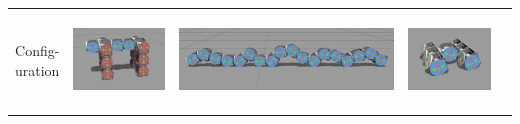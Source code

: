 \documentclass{standalone}
\newcommand{\picHeight}{1in}
\begin{document}
        \begin{tabular}{| c | c | c | c | c |}
            \hline
            \pbox{20cm}{Config-\\uration} &
            \includegraphics[height=\picHeight]{walk4.png} &
            \includegraphics[height=\picHeight]{snake18.png} &
            \includegraphics[height=\picHeight]{car.png} &

\end{tabular}
\end{document}
